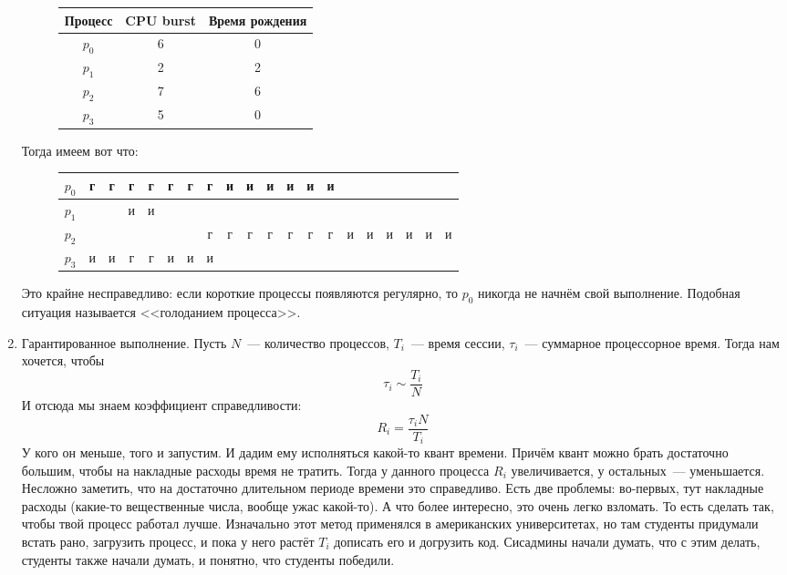 \documentclass{article}
\begin{document}
\begin{enumerate}
        \begin{figure}[H]
            \begin{tabular}{|c|c|c|}
                \hline
                Процесс & CPU burst & Время рождения\\
                \hline
                $p_0$ & 6 & 0\\
                \hline
                $p_1$ & 2 & 2\\
                \hline
                $p_2$ & 7 & 6\\
                \hline
                $p_3$ & 5 & 0\\
                \hline
            \end{tabular}
        \end{figure}
        Тогда имеем вот что:
        \begin{figure}[H]
            \begin{tabular}{|c|cc|cc|cc|c|cc|cc|cc|cccccc|}
                \hline
                $p_0$&г&г&г&г&г&г&г&и&и&и&и&и&и&&&&&&\\
                \hline
                $p_1$&&&и&и&&&&&&&&&&&&&&&\\
                \hline
                $p_2$&&&&&&&г&г&г&г&г&г&г&и&и&и&и&и&и\\
                \hline
                $p_3$&и&и&г&г&и&и&и&&&&&&&&&&&&\\
                \hline
            \end{tabular}
        \end{figure}
        Это крайне несправедливо: если короткие процессы появляются регулярно, то $p_0$ никогда не начнём свой выполнение. Подобная ситуация называется <<голоданием процесса>>.
        \item Гарантированное выполнение. Пусть $N$~--- количество процессов, $T_i$~--- время сессии, $\tau_i$~--- суммарное процессорное время. Тогда нам хочется, чтобы
        $$
        \tau_i\sim\frac{T_i}N
        $$
        И отсюда мы знаем коэффициент справедливости:
        $$
        R_i=\frac{\tau_i N}{T_i}
        $$
        У кого он меньше, того и запустим. И дадим ему исполняться какой-то квант времени. Причём квант можно брать достаточно большим, чтобы на накладные расходы время не тратить. Тогда у данного процесса $R_i$ увеличивается, у остальных~--- уменьшается. Несложно заметить, что на достаточно длительном периоде времени это справедливо. Есть две проблемы: во-первых, тут накладные расходы (какие-то вещественные числа, вообще ужас какой-то). А что более интересно, это очень легко взломать. То есть сделать так, чтобы твой процесс работал лучше. Изначально этот метод применялся в американских университетах, но там студенты придумали встать рано, загрузить процесс, и пока у него растёт $T_i$ дописать его и догрузить код. Сисадмины начали думать, что с этим делать, студенты также начали думать, и понятно, что студенты победили.\\

\end{enumerate}
\end{document}
